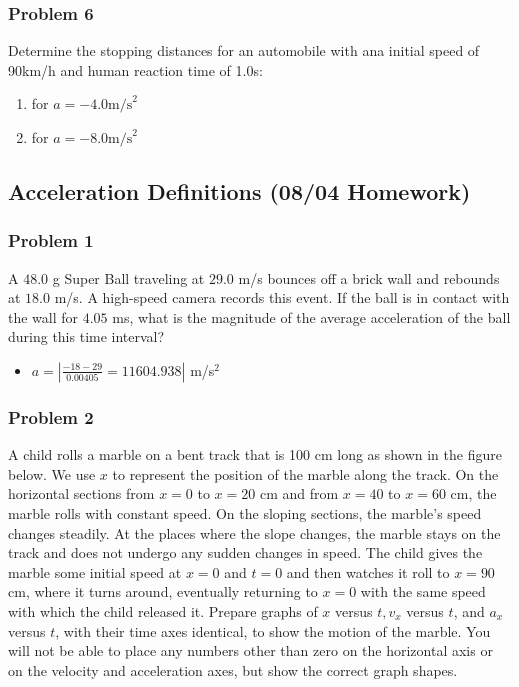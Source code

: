 \documentclass[
  letterpaper,
  DIV=11,
  numbers=noendperiod]{scrartcl}
\providecommand{\tightlist}{%
  \setlength{\itemsep}{0pt}\setlength{\parskip}{0pt}}\usepackage{longtable,booktabs,array}
\begin{document}
\hypertarget{problem-6}{%
\subsubsection{Problem 6}\label{problem-6}}

Determine the stopping distances for an automobile with ana initial
speed of 90km/h and human reaction time of 1.0s:

\begin{enumerate}
\def\labelenumi{(\alph{enumi})}
\tightlist
\item
  for \(a =-4.0 \text{m/s}^2\)
\item
  for \(a = -8.0 \text{m/s}^2\)
\end{enumerate}

\hypertarget{acceleration-definitions-0804-homework}{%
\subsection{Acceleration Definitions (08/04
Homework)}\label{acceleration-definitions-0804-homework}}

\hypertarget{problem-1-2}{%
\subsubsection{Problem 1}\label{problem-1-2}}

A \(48.0\) g Super Ball traveling at \(29.0\) m/s bounces off a brick
wall and rebounds at \(18.0\) m/s. A high-speed camera records this
event. If the ball is in contact with the wall for \(4.05\) ms, what is
the magnitude of the average acceleration of the ball during this time
interval?

\begin{itemize}
\tightlist
\item
  \(a = \left|\frac{-18-29}{0.00405} = 11604.938\right|\) m/s\(^2\)
\end{itemize}

\newpage{}

\hypertarget{problem-2-2}{%
\subsubsection{Problem 2}\label{problem-2-2}}

A child rolls a marble on a bent track that is 100 cm long as shown in
the figure below. We use \(x\) to represent the position of the marble
along the track. On the horizontal sections from \(x=0\) to \(x=20\) cm
and from \(x=40\) to \(x=60\) cm, the marble rolls with constant speed.
On the sloping sections, the marble's speed changes steadily. At the
places where the slope changes, the marble stays on the track and does
not undergo any sudden changes in speed. The child gives the marble some
initial speed at \(x=0\) and \(t=0\) and then watches it roll to
\(x=90\) cm, where it turns around, eventually returning to \(x=0\) with
the same speed with which the child released it. Prepare graphs of \(x\)
versus \(t, v_x\) versus \(t\), and \(a_x\) versus \(t\), with their
time axes identical, to show the motion of the marble. You will not be
able to place any numbers other than zero on the horizontal axis or on
the velocity and acceleration axes, but show the correct graph shapes.
\end{document}
